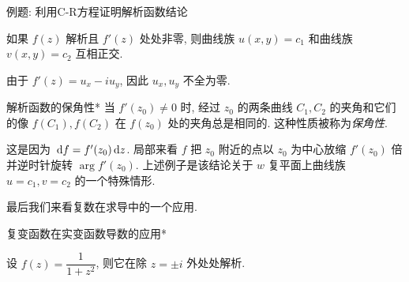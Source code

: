 \begin{frame}{例题: 利用C-R方程证明解析函数结论}
\onslide<+->
\begin{example}
如果 $f(z)$ 解析且 $f'(z)$ 处处非零, 则曲线族 $u(x,y)=c_1$ 和曲线族 $v(x,y)=c_2$ 互相正交.
\end{example}
\onslide<+->
\begin{proof*}
由于 $f'(z)=u_x-iu_y$, 因此 $u_x,u_y$ 不全为零.

\end{proof*}
\end{frame}


\begin{frame}{解析函数的保角性*}
\onslide<+->
当 $f'(z_0)\neq 0$ 时, 
\onslide<+->
经过 $z_0$ 的两条曲线 $C_1,C_2$ 的夹角和它们的像 $f(C_1),f(C_2)$ 在 $f(z_0)$ 处的夹角总是相同的.
\onslide<+->
这种性质被称为\emph{保角性}.

\onslide<+->
这是因为 $\,\mathrm{d} f=f'(z_0)\,\mathrm{d} z$.
\onslide<+->
局部来看 $f$ 把 $z_0$ 附近的点以 $z_0$ 为中心放缩 $f'(z_0)$ 倍并逆时针旋转 $\arg{f'(z_0)}$.
\onslide<+->
上述例子是该结论关于 $w$ 复平面上曲线族 $u=c_1,v=c_2$ 的一个特殊情形.

\onslide<+->
最后我们来看复数在求导中的一个应用.
\end{frame}


\begin{frame}{复变函数在实变函数导数的应用*}
\onslide<+->
\begin{example}
设 $f(z)=\dfrac1{1+z^2}$, 则它在除 $z=\pm i$ 外处处解析.
\vspace{-\baselineskip}
\end{example}
\end{frame}

